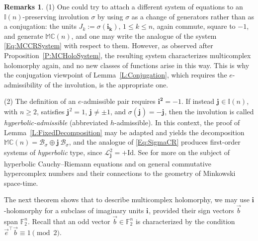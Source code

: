 \documentclass[12pt]{amsart}
\theoremstyle{plain}
\theoremstyle{definition}
\newtheorem*{remarks}{Remarks}
\numberwithin{equation}{section}
\newcommand{\im}[1]{\mathbf{ i_{#1}}}
\newcommand{\ims}[1]{\mathbf{ i_{#1}^2}}
\newcommand{\jm}[1]{\mathbf{ j_{#1}}}
\newcommand{\mC}{\mathbb{C}}
\newcommand{\mM}{\mathbb{M}}
\newcommand{\mI}{\mathbb{I}}
\newcommand{\cL}{\mathcal{L}}
\newcommand{\cB}{\mathcal{B}}
\begin{document}
    \begin{remarks}
    (1) One could try to attach a different system of equations to an $\mI(n)$-preserving involution $\sigma$ by using $\sigma$ as a change of generators rather than as a conjugation: the units $J_k := \sigma (\im{k})$, $1 \leq k \leq n$, again commute, square to $-1$, and generate $\mM \mC(n)$, and one may write the analogue of the system \eqref{Eq:MCCRSystem} with respect to them. However, as observed after Proposition~\ref{P:MCHoloSystem}, the resulting system characterizes multicomplex holomorphy again, and no new classes of functions arise in this way. This is why the conjugation viewpoint of Lemma~\ref{L:Conjugation}, which requires the $e$-admissibility of the involution, is the appropriate one.

    (2) The definition of an $e$-admissible pair requires $\ims{} = -1$. If instead $\jm{} \in \mI(n)$, with $n \geq 2$, satisfies $\jm{}^2 = 1$, $\jm{} \neq \pm 1$, and $\sigma (\jm{} ) = - \jm{}$, then the involution is called \emph{hyperbolic-admissible} (abbreviated $h$-admissible). In this context, the proof of Lemma~\ref{L:FixedDecomposition} may be adapted and yields the decomposition $\mM \mC(n) = \cB_\sigma \oplus \jm{}\, \cB_\sigma$, and the analogue of \eqref{Eq:SigmaCR} produces first-order systems of \emph{hyperbolic} type, since $\cL_{\jm{}}^2 = + \mathrm{Id}$. See \cite{Catoni2008} for more on the subject of hyperbolic Cauchy--Riemann equations and on general commutative hypercomplex numbers and their connections to the geometry of Minkowski space-time.    \end{remarks}

The next theorem shows that to describe multicomplex holomorphy, we may use $\im{}$-holomorphy for a subclass of imaginary units $\im{}$, provided their sign vectors $\vec{b}$ span $\mathbb{F}_2^n$. Recall that an odd vector $\vec{b} \in \mathbb{F}_2^n$ is characterized by the condition $\vec{e}^\top \vec{b} \equiv 1 \pmod 2$. 
\end{document}
